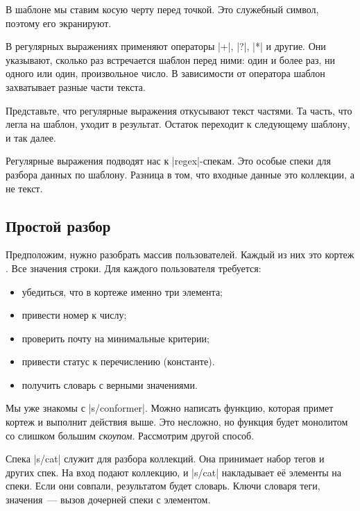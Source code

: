 В шаблоне мы ставим косую черту перед точкой. Это служебный символ, поэтому его
экранируют.

В регулярных выражениях применяют операторы \spverb|+|, \spverb|?|, \spverb|*| и
другие. Они указывают, сколько раз встречается шаблон перед ними: один и более
раз, ни одного или один, произвольное число. В зависимости от оператора шаблон
захватывает разные части текста.

Представьте, что регулярные выражения откусывают текст частями. Та часть, что
легла на шаблон, уходит в результат. Остаток переходит к следующему шаблону, и
так далее.

Регулярные выражения подводят нас к \spverb|regex|-спекам. Это особые спеки для
разбора данных по шаблону. Разница в том, что входные данные это коллекции, а не
текст.


\subsection{Простой разбор}

Предположим, нужно разобрать массив пользователей. Каждый из них это кортеж
. Все значения строки. Для каждого пользователя
требуется:

\begin{itemize}

\item
  убедиться, что в кортеже именно три элемента;

\item
  привести номер к числу;

\item
  проверить почту на минимальные критерии;

\item
  привести статус к перечислению (константе).

\item
  получить словарь с верными значениями.

\end{itemize}

Мы уже знакомы с \spverb|s/conformer|. Можно написать функцию, которая примет
кортеж и выполнит действия выше. Это несложно, но функция будет монолитом со
слишком большим \emph{скоупом}. Рассмотрим другой способ.


Спека \spverb|s/cat| служит для разбора коллекций. Она принимает набор тегов и
других спек. На вход подают коллекцию, и \spverb|s/cat| накладывает е\"{е} элементы
на спеки. Если они совпали, результатом будет словарь. Ключи словаря теги,
значения~--- вызов дочерней спеки с элементом.

